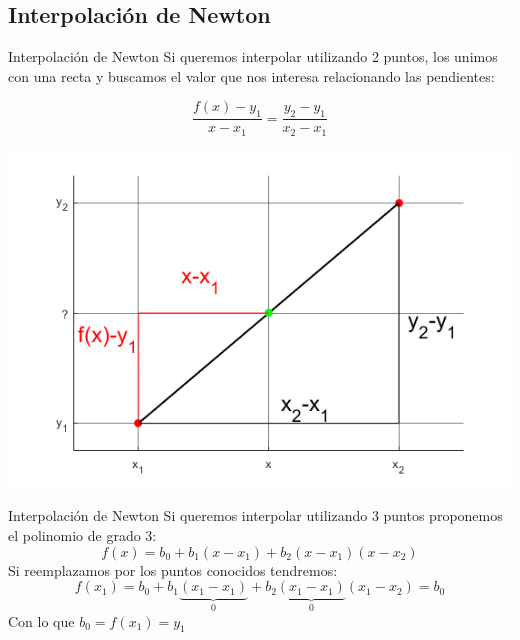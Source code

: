\documentclass[xcolor=svgnames]{beamer} %
\theoremstyle{plain}
\theoremstyle{definition}
\begin{document}
\subsection{Interpolación de Newton}

\begin{frame}{Interpolación de Newton}
  Si queremos interpolar utilizando 2 puntos, los unimos con una recta y buscamos el valor que nos interesa relacionando las pendientes:
  
  \begin{minipage}{.45\linewidth}
  $$ \frac{f(x) - y_1}{x-x_1}  = \frac{y_2-y_1}{x_2-x_1} $$
  \end{minipage}\vline \begin{minipage}{.45\linewidth}
    \includegraphics[width=\linewidth]{triangulosSemejantes.png} 
  \end{minipage}

\end{frame}




\begin{frame}{Interpolación de Newton}
  Si queremos interpolar utilizando 3 puntos proponemos el polinomio de grado 3:
  $$ f(x) = b_0 + b_1(x-x_1) + b_2(x-x_1)(x-x_2)  $$ 
  Si reemplazamos por los puntos conocidos tendremos: \pause
  $$ f(x_1) = b_0 + b_1\underbrace{(x_1-x_1)}_{0} + b_2\underbrace{(x_1-x_1)}_{0}(x_1-x_2) = b_0$$
  Con lo que $\boxed{ b_0 = f(x_1) = y_1}$

\end{frame}
\end{document}
